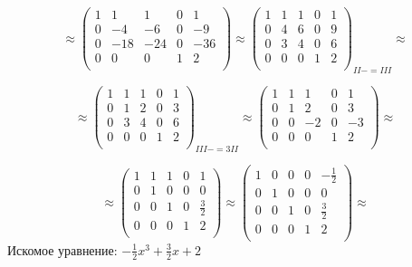 \documentclass[a4paper]{article}
\begin{document}
\begin{equation*}
\approx
 \left(\begin{array}{rrrr|r}
   1 & 1 & 1 & 0 & 1\\
   0 & -4 & -6 & 0 & -9\\ 
   0 & -18 & -24 & 0 & -36\\ 
    0 & 0 & 0 & 1 & 2\\ 
   \end{array}\right)
\approx
 \left(\begin{array}{rrrr|r}
   1 & 1 & 1 & 0 & 1\\
   0 & 4 & 6 & 0 & 9\\ 
   0 & 3 & 4 & 0 & 6\\ 
    0 & 0 & 0 & 1 & 2\\ 
   \end{array}\right)_{II -= III}
  \approx
\end{equation*}

\begin{equation*}
\approx
 \left(\begin{array}{rrrr|r}
   1 & 1 & 1 & 0 & 1\\
   0 & 1 & 2 & 0 & 3\\ 
   0 & 3 & 4 & 0 & 6\\ 
    0 & 0 & 0 & 1 & 2\\ 
   \end{array}\right)_{III -= 3II}
\approx
 \left(\begin{array}{rrrr|r}
   1 & 1 & 1 & 0 & 1\\
   0 & 1 & 2 & 0 & 3\\ 
   0 & 0 & -2 & 0 & -3\\ 
    0 & 0 & 0 & 1 & 2\\
   \end{array}\right)
  \approx
\end{equation*}

\begin{equation*}
\approx
 \left(\begin{array}{rrrr|r}
   1 & 1 & 1 & 0 & 1\\
   0 & 1 & 0 & 0 & 0\\ 
   0 & 0 & 1 & 0 & \frac{3}{2}\\ 
    0 & 0 & 0 & 1 & 2\\
   \end{array}\right)
\approx
 \left(\begin{array}{rrrr|r}
   1 & 0 & 0 & 0 & -\frac{1}{2}\\
   0 & 1 & 0 & 0 & 0\\ 
   0 & 0 & 1 & 0 & \frac{3}{2}\\ 
    0 & 0 & 0 & 1 & 2\\
   \end{array}\right)
  \approx
\end{equation*}
Искомое уравнение: $-\frac{1}{2}x^3 + \frac{3}{2}x + 2$
\end{document}
